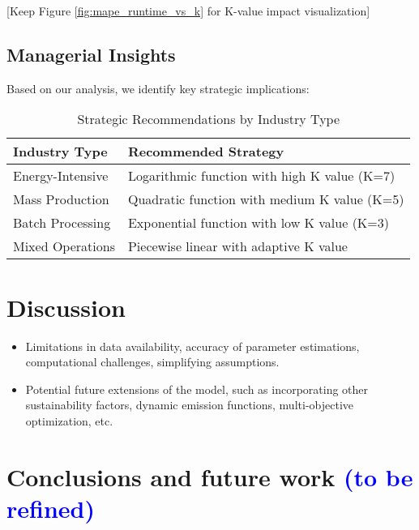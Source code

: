 \documentclass[final,3p,times,review,authoryear]{elsarticle}
\begin{document}
[Keep Figure \ref{fig:mape_runtime_vs_k} for K-value impact visualization]

\subsection{Managerial Insights}
Based on our analysis, we identify key strategic implications:

\begin{table}[htbp]
    \centering
    \caption{Strategic Recommendations by Industry Type}
    \label{tab:recommendations}
    \begin{tabular}{ll}
        \toprule
        Industry Type & Recommended Strategy \\
        \midrule
        Energy-Intensive & Logarithmic function with high K value (K=7) \\
        Mass Production & Quadratic function with medium K value (K=5) \\
        Batch Processing & Exponential function with low K value (K=3) \\
        Mixed Operations & Piecewise linear with adaptive K value \\
        \bottomrule
    \end{tabular}
\end{table}

\section{Discussion}

\begin{itemize}
    \item Limitations in data availability, accuracy of parameter estimations, computational challenges, simplifying assumptions.
    \item Potential future extensions of the model, such as incorporating other sustainability factors, dynamic emission functions, multi-objective optimization, etc.
\end{itemize}

\section{Conclusions and future work \textcolor{blue}{(to be refined)}}
\end{document}
